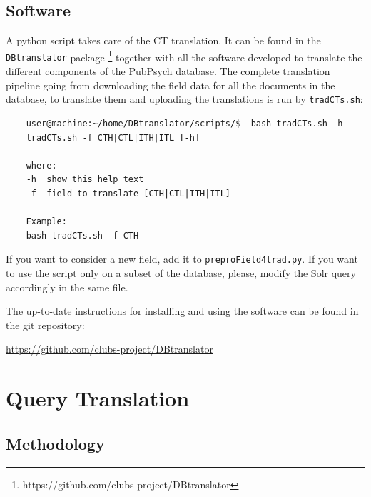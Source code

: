 \documentclass[a4paper,11pt]{article}
\begin{document}
	\subsection{Software}
	
	A python script takes care of the CT translation. It can be found in the {\tt DBtranslator} package%
	\footnote{\url{}https://github.com/clubs-project/DBtranslator}
	together with all the software developed to translate the different components of the PubPsych database.
	The complete translation pipeline going from downloading the field data for all the documents in the database, to translate them and uploading the translations is run by {\tt tradCTs.sh}:
	
	\begin{verbatim}
	user@machine:~/home/DBtranslator/scripts/$  bash tradCTs.sh -h
	tradCTs.sh -f CTH|CTL|ITH|ITL [-h] 
	
	where:
	-h  show this help text
	-f  field to translate [CTH|CTL|ITH|ITL]
	
	Example:
	bash tradCTs.sh -f CTH
	\end{verbatim}
	
	If you want to consider a new field, add it to {\tt preproField4trad.py}. If you want to use the script only on a subset of the database, please, modify the Solr query accordingly in the same file. 
	
	The up-to-date instructions for installing and using the software can be found in the git repository:
	
	\url{https://github.com/clubs-project/DBtranslator}
	
	
	\section{Query Translation}
	\label{s:qtrad}
	
	\subsection{Methodology}
	
\end{document}
